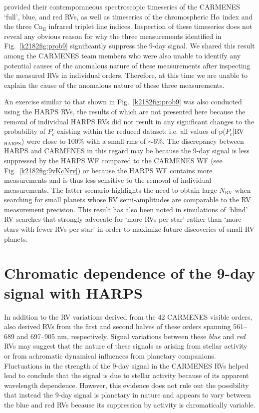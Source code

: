  provided their contemporaneous spectroscopic timeseries of the CARMENES `full', 
blue, and red RVs, as well as timeseries of the chromospheric  H$\alpha$ index and the three Ca$_{\text{II}}$ infrared
triplet line indices. Inspection of these timeseries does not reveal any obvious reason for why the three
measurements identified in Fig.~\ref{k2182fig:prob9} significantly suppress the 9-day signal.
We shared this result among the CARMENES team
members who were also unable to identify any potential causes of the anomalous nature of these measurements
after inspecting the measured RVs in individual orders. Therefore, at this time we are unable to explain
the cause of the anomalous nature of these three measurements.

An exercise similar to that  shown in Fig.~\ref{k2182fig:prob9} was also conducted using the HARPS RVs,  the results of which
are not presented here because the removal of individual HARPS RVs did not result
in any significant changes to the probability of $P_c$ existing within the reduced dataset; i.e. all values of
p($P_c$|RV$_{\text{HARPS}}$) were close to 100\% with a small rms of $\sim 6$\%.
The discrepancy between HARPS and CARMENES in this regard may be because the 9-day signal
is less suppressed by the HARPS WF compared to the CARMENES WF (see Fig.~\ref{k2182fig:9vKcNrv}) or because the HARPS
WF contains more measurements and is thus less sensitive to the removal of individual measurements. The latter
scenario highlights the need to obtain large $N_{\text{RV}}$ when searching for small planets whose RV
semi-amplitudes are comparable to the RV measurement precision. This result has also been noted in simulations of
`blind' RV searches \citep[e.g.][]{cloutier18a} that strongly advocate for `more RVs per star' rather than `more stars
with fewer RVs per star' in order to maximize future discoveries of small RV planets.


\section{Chromatic dependence of the 9-day signal with HARPS} \label{k2182sect:act}
In addition to the RV variations derived from the 42 CARMENES visible orders,  also derived RVs from
the first and second halves of these orders spanning 561--689 and 697--905 nm, respectively. Signal variations between
these \emph{blue} and \emph{red} RVs may suggest that the nature of these signals as arising from stellar activity or
from achromatic dynamical influences from planetary companions. 
Fluctuations in the strength of the 9-day signal in the CARMENES RVs helped lead 
to conclude that the signal is due to stellar activity because of its apparent wavelength dependence. However, this
evidence does not rule out the possibility that instead the 9-day signal is planetary in nature and appears to vary
between the blue and red RVs because its suppression by activity is chromatically variable.

